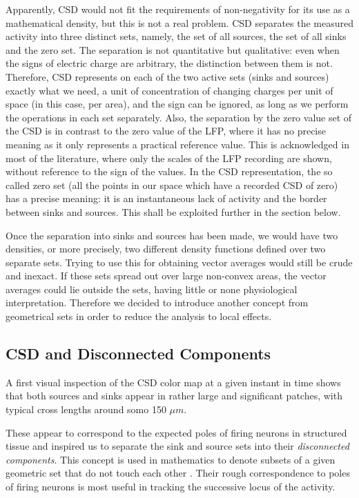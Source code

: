 \documentclass[12pt]{article}
\begin{document}
Apparently, CSD would not fit the requirements of non-negativity for its use as a mathematical density, but this is not a real problem.  CSD separates the measured activity into three distinct sets, namely, the set of all sources, the set of all sinks and the zero set. The separation is not quantitative but qualitative: even when the signs of electric charge are arbitrary, the distinction between them is not. Therefore, CSD represents on each of the two active sets (sinks and sources) exactly what we need, a unit of concentration of changing charges per unit of space (in this case, per area), and the sign can be ignored, as long as we perform the operations in each set separately. Also, the separation by the zero value set of the CSD is in contrast to the zero value of the LFP, where it has no precise meaning as it only represents a practical reference value. This is acknowledged in most of the literature, where only the scales of the LFP recording are shown, without reference to the sign of the values. In the CSD representation,  the so called zero set (all the points in our space which have a recorded CSD of zero)  has a precise meaning: it is an instantaneous lack of activity and the border between sinks and sources. This shall be exploited further in the section below.

Once the separation into sinks and sources has been made, we would have two densities, or more precisely, two different density functions defined over two separate sets. Trying to use this for obtaining vector averages would still be crude and inexact. If these sets spread out over large non-convex areas, the vector averages could lie outside the sets, having little or none physiological interpretation. Therefore we decided to introduce another concept from geometrical sets in order to reduce the analysis to local effects.


\subsection{CSD and Disconnected Components}

A first visual inspection of the CSD color map at a given instant in time shows that both sources and sinks appear in rather large and significant patches, with typical
cross lengths around somo 150 $\mu m$.

These appear to correspond to the expected poles of firing neurons in structured tissue \cite{Buzsaki2012} and inspired us to separate the sink and source  sets into their \emph{disconnected components}. This concept is used in mathematics to denote subsets of a given geometric set that do not touch each other  \cite{Halmos}. Their rough correspondence to poles of firing neurons is most useful in tracking the successive locus of the activity.
\end{document}
